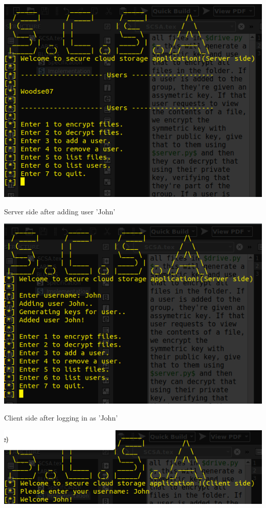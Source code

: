 \documentclass[12pt]{report}
\begin{document}
\begin{center}
\includegraphics[scale=0.5]{server1.png}
\end{center}
Server side after adding user 'John'
\begin{center}
\includegraphics[scale=0.5]{server2.png}
\end{center}
Client side after logging in as 'John'
\begin{center}
\includegraphics[scale=0.5]{client1.png}
\end{center}
\end{document}
